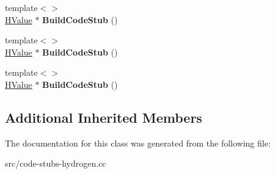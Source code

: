 \begin{DoxyCompactItemize}
\item 
\hypertarget{classv8_1_1internal_1_1_code_stub_graph_builder_a35d188bc90b5c27746518bd1acbc04dd}{}{\footnotesize template$<$$>$ }\\\hyperlink{classv8_1_1internal_1_1_h_value}{H\+Value} $\ast$ {\bfseries Build\+Code\+Stub} ()\label{classv8_1_1internal_1_1_code_stub_graph_builder_a35d188bc90b5c27746518bd1acbc04dd}

\item 
\hypertarget{classv8_1_1internal_1_1_code_stub_graph_builder_a3848e416aa7f2524d20c4d360264f375}{}{\footnotesize template$<$$>$ }\\\hyperlink{classv8_1_1internal_1_1_h_value}{H\+Value} $\ast$ {\bfseries Build\+Code\+Stub} ()\label{classv8_1_1internal_1_1_code_stub_graph_builder_a3848e416aa7f2524d20c4d360264f375}

\item 
\hypertarget{classv8_1_1internal_1_1_code_stub_graph_builder_a3d986afa454d1cdf22f25f9de5aeb0f2}{}{\footnotesize template$<$$>$ }\\\hyperlink{classv8_1_1internal_1_1_h_value}{H\+Value} $\ast$ {\bfseries Build\+Code\+Stub} ()\label{classv8_1_1internal_1_1_code_stub_graph_builder_a3d986afa454d1cdf22f25f9de5aeb0f2}

\end{DoxyCompactItemize}
\subsection*{Additional Inherited Members}


The documentation for this class was generated from the following file\+:\begin{DoxyCompactItemize}
\item 
src/code-\/stubs-\/hydrogen.\+cc\end{DoxyCompactItemize}
